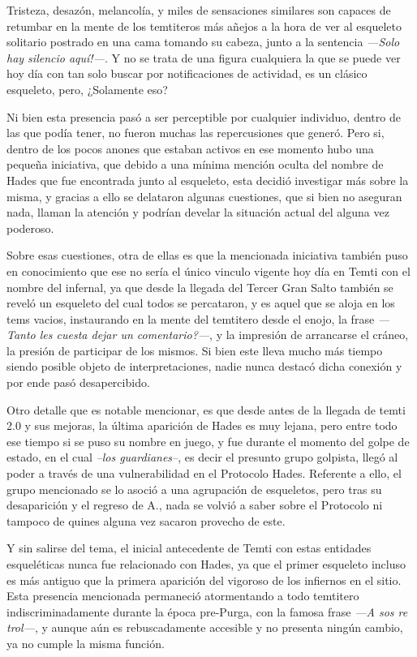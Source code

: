 \documentclass[
  spanish,
]{book}
\begin{document}
Tristeza, desazón, melancolía, y miles de sensaciones similares son capaces de retumbar en la mente de los temtiteros más añejos a la hora de ver al esqueleto solitario postrado en una cama tomando su cabeza, junto a la sentencia \emph{---Solo hay silencio aquí!---}. Y no se trata de una figura cualquiera la que se puede ver hoy día con tan solo buscar por notificaciones de actividad, es un clásico esqueleto, pero, ¿Solamente eso?

Ni bien esta presencia pasó a ser perceptible por cualquier individuo, dentro de las que podía tener, no fueron muchas las repercusiones que generó. Pero si, dentro de los pocos anones que estaban activos en ese momento hubo una pequeña iniciativa, que debido a una mínima mención oculta del nombre de Hades que fue encontrada junto al esqueleto, esta decidió investigar más sobre la misma, y gracias a ello se delataron algunas cuestiones, que si bien no aseguran nada, llaman la atención y podrían develar la situación actual del alguna vez poderoso.

Sobre esas cuestiones, otra de ellas es que la mencionada iniciativa también puso en conocimiento que ese no sería el único vinculo vigente hoy día en Temti con el nombre del infernal, ya que desde la llegada del Tercer Gran Salto también se reveló un esqueleto del cual todos se percataron, y es aquel que se aloja en los tems vacios, instaurando en la mente del temtitero desde el enojo, la frase \emph{---Tanto les cuesta dejar un comentario?---}, y la impresión de arrancarse el cráneo, la presión de participar de los mismos. Si bien este lleva mucho más tiempo siendo posible objeto de interpretaciones, nadie nunca destacó dicha conexión y por ende pasó desapercibido.

Otro detalle que es notable mencionar, es que desde antes de la llegada de temti 2.0 y sus mejoras, la última aparición de Hades es muy lejana, pero entre todo ese tiempo si se puso su nombre en juego, y fue durante el momento del golpe de estado, en el cual \emph{--los guardianes--}, es decir el presunto grupo golpista, llegó al poder a través de una vulnerabilidad en el Protocolo Hades. Referente a ello, el grupo mencionado se lo asoció a una agrupación de esqueletos, pero tras su desaparición y el regreso de A., nada se volvió a saber sobre el Protocolo ni tampoco de quines alguna vez sacaron provecho de este.

Y sin salirse del tema, el inicial antecedente de Temti con estas entidades esqueléticas nunca fue relacionado con Hades, ya que el primer esqueleto incluso es más antiguo que la primera aparición del vigoroso de los infiernos en el sitio. Esta presencia mencionada permaneció atormentando a todo temtitero indiscriminadamente durante la época pre-Purga, con la famosa frase \emph{---A sos re trol---}, y aunque aún es rebuscadamente accesible y no presenta ningún cambio, ya no cumple la misma función.
\end{document}
